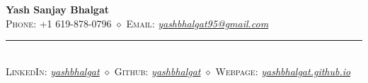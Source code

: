 \documentclass{resume} %
\newcommand\sbullet[1][.5]{\mathbin{\vcenter{\hbox{\scalebox{#1}{$\bullet$}}}}}
\begin{document}


\begin{center}
    {\LARGE \textbf{Yash Sanjay Bhalgat}} \\
    \vspace{5pt}
    \vspace{5pt}
    \textsc{Phone}: +1 619-878-0796 $\diamond$ \textsc{Email}: \textit{\href{mailto:yashbhalgat95@gmail.com}{yashbhalgat95@gmail.com}} \\
    \vspace{-6pt}
    \noindent\rule{0.7\textwidth}{0.6pt}\\
    \vspace{-1pt}
    \textsc{LinkedIn}: \textit{\href{https://www.linkedin.com/in/yashbhalgat/}{yashbhalgat}}
    $\diamond$ \textsc{Github}: \textit{\href{https://github.com/yashbhalgat}{yashbhalgat}} $\diamond$
    \textsc{Webpage}: \textit{\href{https://yashbhalgat.github.io}{yashbhalgat.github.io}}
\end{center}

\end{document}
